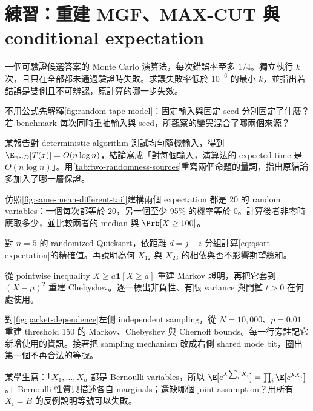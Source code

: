 \documentclass[11pt,a4paper,oneside,openany]{book}
\begin{document}
\section{練習：重建 MGF、MAX-CUT 與 conditional expectation}
\begin{exercise}
\label{ex:amplification}
一個可驗證候選答案的 Monte Carlo 演算法，每次錯誤率至多 $1/4$。獨立執行 $k$ 次，且只在全部都未通過驗證時失敗。求讓失敗率低於 $10^{-6}$ 的最小 $k$，並指出若錯誤是雙側且不可辨認，原計算的哪一步失效。
\end{exercise}
\begin{exercise}
不用公式先解釋\cref{fig:random-tape-model}：固定輸入與固定 seed 分別固定了什麼？若 benchmark 每次同時重抽輸入與 seed，所觀察的變異混合了哪兩個來源？
\end{exercise}
\begin{exercise}
某報告對 deterministic algorithm 測試均勻隨機輸入，得到 $\E_{x\sim D}[T(x)]=O(n\log n)$，結論寫成「對每個輸入，演算法的 expected time 是 $O(n\log n)$」。用\cref{tab:two-randomness-sources}重寫兩個命題的量詞，指出原結論多加入了哪一層保證。
\end{exercise}
\begin{exercise}
仿照\cref{fig:same-mean-different-tail}建構兩個 expectation 都是 20 的 random variables：一個每次都等於 20，另一個至少 95\% 的機率等於 0。計算後者非零時應取多少，並比較兩者的 median 與 $\Prb[X\ge100]$。
\end{exercise}
\begin{exercise}
對 $n=5$ 的 randomized Quicksort，依距離 $d=j-i$ 分組計算\cref{eq:qsort-expectation}的精確值。再說明為何 $X_{12}$ 與 $X_{23}$ 的相依與否不影響期望總和。
\end{exercise}
\begin{exercise}
從 pointwise inequality $X\ge a\mathbf1[X\ge a]$ 重建 Markov 證明，再把它套到 $(X-\mu)^2$ 重建 Chebyshev。逐一標出非負性、有限 variance 與門檻 $t>0$ 在何處使用。
\end{exercise}
\begin{exercise}
\label{ex:packet-tail}
對\cref{fig:packet-dependence}左側 independent sampling，從 $N=10{,}000$、$p=0.01$ 重建 threshold 150 的 Markov、Chebyshev 與 Chernoff bounds。每一行旁註記它新增使用的資訊。接著把 sampling mechanism 改成右側 shared mode bit，圈出第一個不再合法的等號。
\end{exercise}
\begin{exercise}
某學生寫：「$X_1,\ldots,X_n$ 都是 Bernoulli variables，所以 $\E[e^{\lambda\sum_iX_i}]=\prod_i\E[e^{\lambda X_i}]$。」Bernoulli 性質只描述各自 marginals；還缺哪個 joint assumption？用所有 $X_i=B$ 的反例說明等號可以失敗。
\end{exercise}
\end{document}
